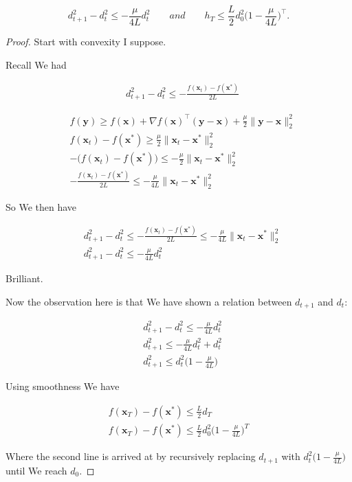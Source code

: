 \documentclass{article}
\begin{document}
\[ d^2_{t+1} - d^2_t \le -\frac{\mu}{4L}d^2_t\qquad and\qquad h_T \le \frac{L}{2}d^2_0 \bigg(1 - \frac{\mu}{4L} \bigg)^\top. \]

\begin{proof}

	Start with convexity I suppose. 
	
	Recall We had
	
	\begin{align}
		&d_{t+1}^2 - d_t^2 \le    -\frac{f(\mathbf{x}_t) -  f(\mathbf{x}^*)}{2L} 
	\end{align}
	
	\begin{align}
		&f(\mathbf{y}) \ge f(\mathbf{x}) + \nabla f(\mathbf{x})^\top (\mathbf{y}-\mathbf{x}) + \frac{\mu}{2}\|\mathbf{y} - \mathbf{x}\|^2_2\\
		&f(\mathbf{x}_t) -  f(\mathbf{x}^*) \ge   \frac{\mu}{2}\|\mathbf{x}_t - \mathbf{x}^*\|^2_2\\
		& -\big(f(\mathbf{x}_t) -  f(\mathbf{x}^*)\big) \le   -\frac{\mu}{2}\|\mathbf{x}_t - \mathbf{x}^*\|^2_2\\
		& -\frac{f(\mathbf{x}_t) -  f(\mathbf{x}^*)}{2L} \le  - \frac{\mu}{4L}\|\mathbf{x}_t - \mathbf{x}^*\|^2_2
	\end{align}
	
	So We then have 
	
	\begin{align}
		&d_{t+1}^2 - d_t^2 \le    -\frac{f(\mathbf{x}_t) -  f(\mathbf{x}^*)}{2L} \le - \frac{\mu}{4L}\|\mathbf{x}_t - \mathbf{x}^*\|^2_2 \\
		&d_{t+1}^2 - d_t^2  \le - \frac{\mu}{4L}d_t^2
	\end{align}
	
	Brilliant.
	
	Now the observation here is that We have shown a relation between $d_{t+1}$ and $d_t$:
	
	\begin{align}
		&d_{t+1}^2 - d_t^2  \le - \frac{\mu}{4L}d_t^2\\
		&d_{t+1}^2  \le - \frac{\mu}{4L}d_t^2 + d_t^2 \\
		&d_{t+1}^2  \le d_t^2\bigg( 1 -\frac{\mu}{4L} \bigg)
	\end{align}
	
	Using smoothness We have

	\begin{align}
		f(\mathbf{x}_T) - f(\mathbf{x}^*) \le \frac{L}{2}d_T\\
		f(\mathbf{x}_T) - f(\mathbf{x}^*) \le \frac{L}{2}d_0^2\bigg( 1 -\frac{\mu}{4L} \bigg)^T
	\end{align}
	
	Where the second line is arrived at by recursively replacing $d_{t+1}$ with $d_t^2\big( 1 -\frac{\mu}{4L} \big)$ until We reach $d_0$.

\end{proof}
\end{document}
